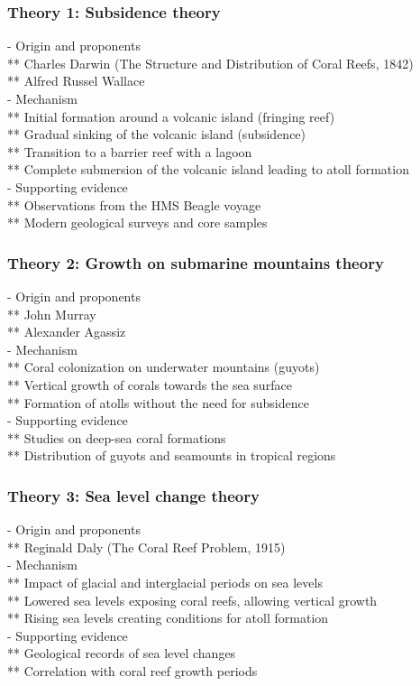 \subsubsection{Theory 1: Subsidence theory}
- Origin and proponents \\
** Charles Darwin (The Structure and Distribution of Coral Reefs, 1842) \\
** Alfred Russel Wallace \\
- Mechanism \\
** Initial formation around a volcanic island (fringing reef) \\
** Gradual sinking of the volcanic island (subsidence) \\
** Transition to a barrier reef with a lagoon \\
** Complete submersion of the volcanic island leading to atoll formation \\
- Supporting evidence \\
** Observations from the HMS Beagle voyage \\
** Modern geological surveys and core samples

\subsubsection{Theory 2: Growth on submarine mountains theory}
- Origin and proponents \\
** John Murray \\
** Alexander Agassiz \\
- Mechanism \\
** Coral colonization on underwater mountains (guyots) \\
** Vertical growth of corals towards the sea surface \\
** Formation of atolls without the need for subsidence \\
- Supporting evidence \\
** Studies on deep-sea coral formations \\
** Distribution of guyots and seamounts in tropical regions

\subsubsection{Theory 3: Sea level change theory}
- Origin and proponents \\
** Reginald Daly (The Coral Reef Problem, 1915) \\
- Mechanism \\
** Impact of glacial and interglacial periods on sea levels \\
** Lowered sea levels exposing coral reefs, allowing vertical growth \\
** Rising sea levels creating conditions for atoll formation \\
- Supporting evidence \\
** Geological records of sea level changes \\
** Correlation with coral reef growth periods

